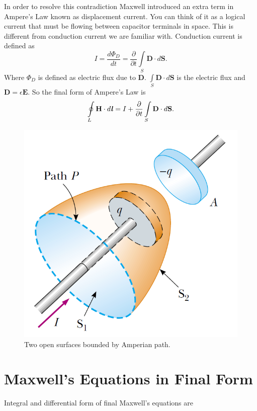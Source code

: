 \documentclass[12pt,a4paper]{article}
\begin{document}
In order to resolve this contradiction Maxwell introduced an extra term in Ampere's Law known as displacement current. You can think of it as a logical current that must be flowing between capacitor terminals in space. This is different from conduction current we are familiar with. Conduction current is defined as
\begin{equation}
I=\dfrac{d\Phi_D}{dt}=\dfrac{\partial}{\partial t}\int\limits_{S}\textbf{D}\cdot d\textbf{S}.
\end{equation}
Where $\Phi_D$ is defined as electric flux due to \textbf{D}. $\int\limits_{S}\textbf{D}\cdot d\textbf{S}$ is the electric flux and $\textbf{D}=\epsilon\textbf{E}$.
So the final form of Ampere's Law is
\begin{equation}
\oint\limits_{L} \textbf{H}\cdot d\textbf{\textit{l}}=I+\dfrac{\partial}{\partial t}\int\limits_{S}\textbf{D}\cdot d\textbf{S}.
\end{equation}
\begin{figure}[H]
\centering
\includegraphics[scale=0.45]{Figure30-25.png}
\caption{Two open surfaces bounded by Amperian path.}
\label{displacement-current}
\end{figure}
\section{Maxwell's Equations in Final Form}
Integral and differential form of final Maxwell's equations are
\end{document}
